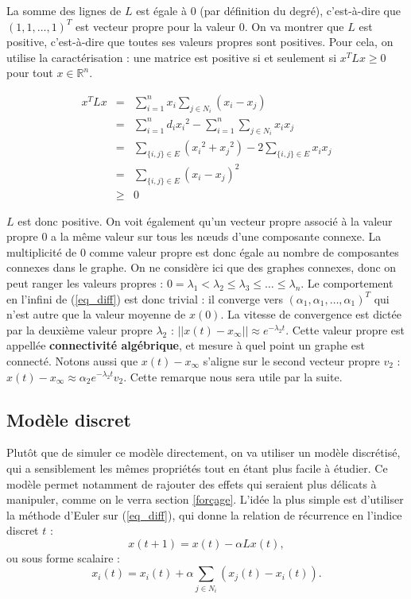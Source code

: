 \documentclass[12pt]{article}
\newcommand{\R}{\mathbb{R}}
\begin{document}
La somme des lignes de $L$ est égale à $0$ (par définition du degré),
c'est-à-dire que $(1, 1, \dots, 1)^T$ est vecteur propre pour la valeur
$0$. On va montrer que $L$ est positive, c'est-à-dire que toutes ses
valeurs propres sont positives. Pour cela, on utilise la
caractérisation : une matrice est positive si et seulement si $x^T L x \geq 0$ pour
tout $x \in \R^n$.

\begin{eqnarray*}
 x^T L x & = & \sum_{i = 1}^n x_i \sum_{j \in N_i} (x_i - x_j) \\
 & = & \sum_{i = 1}^n d_i {x_i}^2 - \sum_{i = 1}^n \sum_{j \in N_i} x_i x_j \\
 & = & \sum_{\{i, j\} \in E} ({x_i}^2 + {x_j}^2) - 2 \sum_{\{i, j\} \in E} x_i x_j \\
 & = & \sum_{\{i, j\} \in E} (x_i - x_j)^2 \\
 & \geq & 0
\end{eqnarray*}

$L$ est donc positive. On voit également qu'un vecteur propre associé
à la valeur propre $0$ a la même valeur sur tous les n\oe uds d'une
composante connexe. La multiplicité de $0$ comme valeur propre est
donc égale au nombre de composantes connexes dans le graphe. On ne
considère ici que des graphes connexes, donc on peut ranger les
valeurs propres : $0 = \lambda_1 < \lambda_2 \leq \lambda_3 \leq \dots
\leq \lambda_n$. Le comportement en l'infini de (\ref{eq_diff}) est
donc trivial : il converge vers $(\alpha_1, \alpha_1, \dots,
\alpha_1)^T$ qui n'est autre que la valeur moyenne de $x(0)$. La
vitesse de convergence est dictée par la deuxième valeur propre
$\lambda_2$ : $||x(t) - x_\infty|| \approx e^{-\lambda_2 t}$. Cette
valeur propre est appellée {\bf connectivité algébrique}, et mesure à
quel point un graphe est connecté. Notons aussi que $x(t) - x_\infty$
s'aligne sur le second vecteur propre $v_2$ : $x(t) - x_\infty \approx
\alpha_2 e^{-\lambda_2 t} v_2$. Cette remarque nous sera utile par la
suite.

\subsection{Modèle discret}
\label{mod_discret}
Plutôt que de simuler ce modèle directement, on va utiliser un modèle
discrétisé, qui a sensiblement les mêmes propriétés tout en étant plus
facile à étudier. Ce modèle permet notamment de rajouter des effets
qui seraient plus délicats à manipuler, comme on le verra section
\ref{forçage}. L'idée la plus simple est d'utiliser la méthode d'Euler
sur (\ref{eq_diff}), qui donne la relation de récurrence en l'indice
discret $t$ :
\begin{equation}
 \label{eq_discrete}
 x(t+1) = x(t) - \alpha L x(t),
\end{equation}
ou sous forme scalaire :
\begin{equation}
 \label{eq_discrete_scal}
 x_i(t) = x_i(t) + \alpha \sum_{j \in N_i} (x_j(t) - x_i(t)).
\end{equation}
\end{document}
